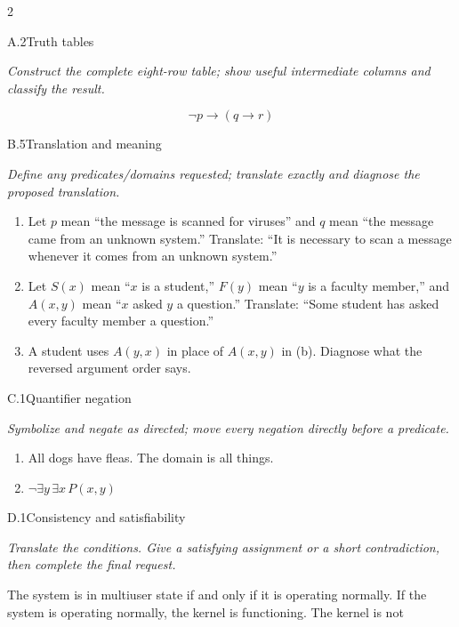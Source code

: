 \documentclass[9pt]{extarticle}
\begin{document}
\CoreWorkArea
\FormBreak
{}
\begin{multicols}{2}
\begin{CoreProblem}{A.2}{Truth tables}
{\scriptsize\textit{Construct the complete eight-row table; show useful intermediate columns and classify the result.}\par}
\[
  \neg p\to(q\to r)
\]
\end{CoreProblem}
\begin{CoreProblem}{B.5}{Translation and meaning}
{\scriptsize\textit{Define any predicates/domains requested; translate exactly and diagnose the proposed translation.}\par}
\begin{enumerate}[label=(\alph*)]
  \item Let $p$ mean ``the message is scanned for viruses'' and $q$ mean ``the
        message came from an unknown system.'' Translate: ``It is necessary to
        scan a message whenever it comes from an unknown system.''
  \item Let $S(x)$ mean ``$x$ is a student,'' $F(y)$ mean ``$y$ is a faculty
        member,'' and $A(x,y)$ mean ``$x$ asked $y$ a question.'' Translate:
        ``Some student has asked every faculty member a question.''
  \item A student uses $A(y,x)$ in place of $A(x,y)$ in (b). Diagnose what the
        reversed argument order says.
\end{enumerate}
\end{CoreProblem}
\begin{CoreProblem}{C.1}{Quantifier negation}
{\scriptsize\textit{Symbolize and negate as directed; move every negation directly before a predicate.}\par}
\begin{enumerate}[label=(\alph*)]
  \item All dogs have fleas. The domain is all things.
  \item $\neg\exists y\,\exists x\,P(x,y)$
\end{enumerate}
\end{CoreProblem}
\columnbreak
\begin{CoreProblem}{D.1}{Consistency and satisfiability}
{\scriptsize\textit{Translate the conditions. Give a satisfying assignment or a short contradiction, then complete the final request.}\par}
The system is in multiuser state if and only if it is operating normally. If
the system is operating normally, the kernel is functioning. The kernel is not

\end{CoreProblem}
\end{multicols}
\end{document}

